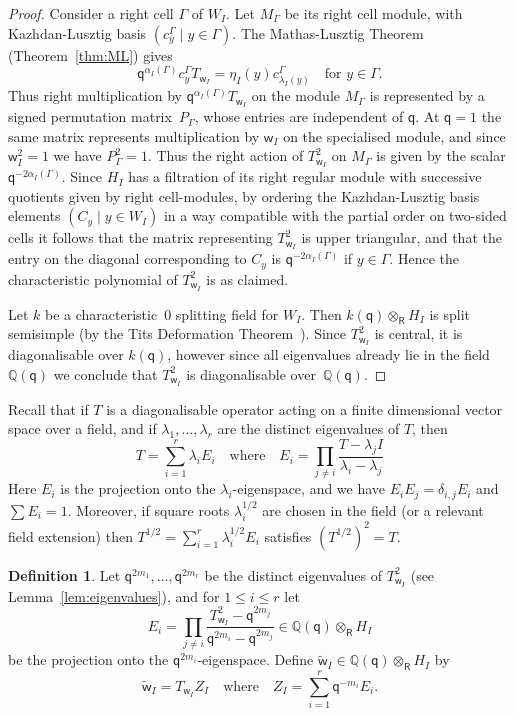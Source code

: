 \documentclass[11pt]{article}
\theoremstyle{plain}
\theoremstyle{definition}
\newtheorem{defn}[thm]{Definition}
\numberwithin{equation}{section}
\def\tw{\widetilde{\mathsf{w}}_I}
\newcommand{\la}{\lambda}
\newcommand{\Ga}{\Gamma}
\def\QQ{\mathbb{Q}}
\def\la{\lambda}
\def\la{\lambda}
\def\sR{\mathsf{R}}
\newcommand{\sw}{\mathsf{w}}
\newcommand{\sq}{\mathsf{q}}
\begin{document}
\begin{proof}
Consider a right cell $\Ga$ of $W_I$. Let $M_{\Ga}$ be its right cell module, with Kazhdan-Lusztig basis $(c_y^{\Ga}\mid y\in\Ga)$. The Mathas-Lusztig Theorem (Theorem~\ref{thm:ML}) gives
$$
\sq^{\alpha_I(\Ga)}c_y^{\Ga}T_{\sw_I}=\eta_I(y)c_{\la_I(y)}^{\Ga}\quad\text{for $y\in \Ga$}.
$$
Thus right multiplication by $\sq^{\alpha_I(\Ga)}T_{\sw_I}$ on the module $M_{\Ga}$ is represented by a signed permutation matrix~$P_{\Ga}$, whose entries are independent of $\sq$. At $\sq=1$ the same matrix represents multiplication by $\sw_I$ on the specialised module, and since $\sw_I^2=1$ we have $P_{\Ga}^2=1$. Thus the right action of $T_{\sw_I}^2$ on $M_{\Ga}$ is given by the scalar $\sq^{-2\alpha_I(\Ga)}$. Since $H_I$ has a filtration of its right regular module with successive quotients given by right cell-modules, by ordering the Kazhdan-Lusztig basis elements $(C_y\mid y\in W_I)$ in a way compatible with the partial order on two-sided cells it follows that the matrix representing $T_{\sw_I}^2$ is upper triangular, and that the entry on the diagonal corresponding to $C_y$ is $\sq^{-2\alpha_I(\Ga)}$ if $y\in\Ga$. Hence the characteristic polynomial of $T_{\sw_I}^2$ is as claimed. 

Let $k$ be a characteristic~$0$ splitting field for $W_I$. Then $k(\sq)\otimes_{\sR}H_I$ is split semisimple (by the Tits Deformation Theorem~\cite[Theorem~7.4.6]{GP:00}). Since $T_{\sw_I}^2$ is central, it is diagonalisable over $k(\sq)$, however since all eigenvalues already lie in the field $\QQ(\sq)$ we conclude that $T_{\sw_I}^2$ is diagonalisable over~$\QQ(\sq)$. 
\end{proof}


Recall that if $T$ is a diagonalisable operator acting on a finite dimensional vector space over a field, and if $\la_1,\ldots,\la_r$ are the distinct eigenvalues of $T$, then 
$$
T=\sum_{i=1}^r\lambda_iE_i\quad\text{where}\quad E_i=\prod_{j\neq i}\frac{T-\la_jI}{\la_i-\la_j}
$$
Here $E_i$ is the projection onto the $\lambda_i$-eigenspace, and we have $E_iE_j=\delta_{i,j}E_i$ and $\sum E_i=1$. Moreover, if square roots $\la_i^{1/2}$ are chosen in the field (or a relevant field extension) then $T^{1/2}=\sum_{i=1}^r\la_i^{1/2}E_i$ satisfies $(T^{1/2})^2=T$. 


\begin{defn}\label{defn:wI}
Let $\sq^{2m_1},\ldots,\sq^{2m_r}$ be the distinct eigenvalues of $T_{\sw_I}^2$ (see Lemma~\ref{lem:eigenvalues}), and for $1\leq i\leq r$ let 
$$
E_i=\prod_{j\neq i}\frac{T_{\sw_I}^2-\sq^{2m_j}}{\sq^{2m_i}-\sq^{2m_j}}\in \QQ(\sq)\otimes_{\sR}H_I
$$
be the projection onto the $\sq^{2m_i}$-eigenspace. Define $\tw\in\QQ(\sq)\otimes_{\sR} H_I$ by 
$$
\tw=T_{\sw_I}Z_I\quad\text{where}\quad Z_I=\sum_{i=1}^r\sq^{-m_i}E_i.
$$
\end{defn}
\end{document}
